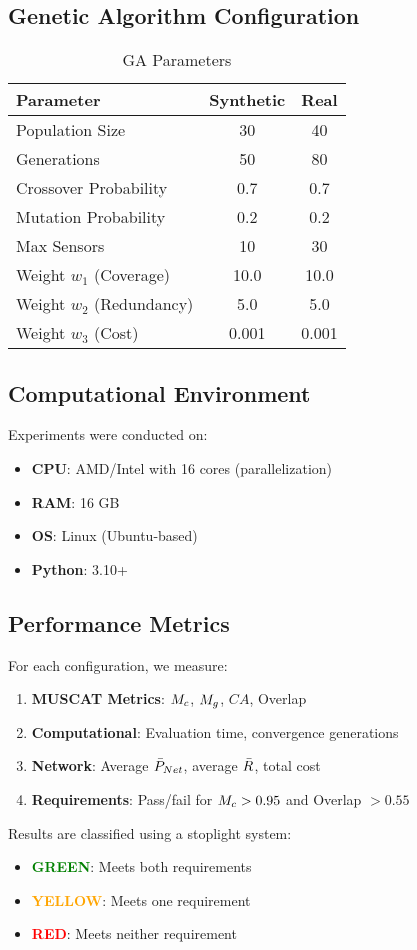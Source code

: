 \subsection{Genetic Algorithm Configuration}

\begin{table}[h]
\centering
\caption{GA Parameters}
\label{tab:ga_params}
\begin{tabular}{lcc}
\toprule
\textbf{Parameter} & \textbf{Synthetic} & \textbf{Real} \\
\midrule
Population Size & 30 & 40 \\
Generations & 50 & 80 \\
Crossover Probability & 0.7 & 0.7 \\
Mutation Probability & 0.2 & 0.2 \\
Max Sensors & 10 & 30 \\
Weight $w_1$ (Coverage) & 10.0 & 10.0 \\
Weight $w_2$ (Redundancy) & 5.0 & 5.0 \\
Weight $w_3$ (Cost) & 0.001 & 0.001 \\
\bottomrule
\end{tabular}
\end{table}

\subsection{Computational Environment}

Experiments were conducted on:
\begin{itemize}
\item \textbf{CPU}: AMD/Intel with 16 cores (parallelization)
\item \textbf{RAM}: 16 GB
\item \textbf{OS}: Linux (Ubuntu-based)
\item \textbf{Python}: 3.10+
\end{itemize}

\subsection{Performance Metrics}

For each configuration, we measure:

\begin{enumerate}
\item \textbf{MUSCAT Metrics}: $M_c$, $M_g$, $CA$, Overlap
\item \textbf{Computational}: Evaluation time, convergence generations
\item \textbf{Network}: Average $\bar{P}_{Net}$, average $\bar{R}$, total cost
\item \textbf{Requirements}: Pass/fail for $M_c > 0.95$ and Overlap $> 0.55$
\end{enumerate}

Results are classified using a stoplight system:
\begin{itemize}
\item \textcolor{green}{\textbf{GREEN}}: Meets both requirements
\item \textcolor{orange}{\textbf{YELLOW}}: Meets one requirement
\item \textcolor{red}{\textbf{RED}}: Meets neither requirement
\end{itemize}


